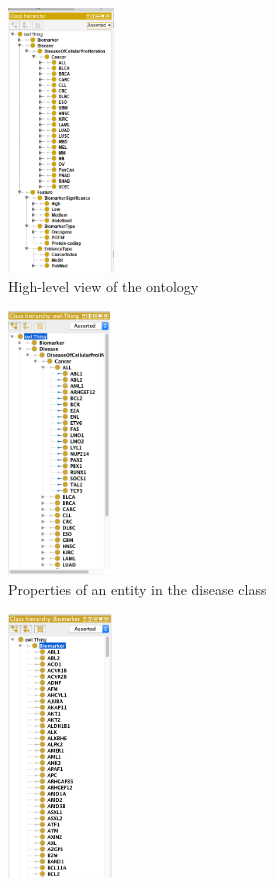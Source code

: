 \begin{figure}[h]
	\centering
	\begin{subfigure}{0.48\linewidth}
	\centering
		\includegraphics[width=0.55\linewidth,height=70mm]{images/OncoReferee.png}
		\caption{High-level view of the ontology}
        \label{fig:main_ontology_pro_view}
	\end{subfigure}
	\begin{subfigure}{0.48\linewidth}
		\centering
		\includegraphics[width=0.55\linewidth,height=70mm]{images/biomarker_view_2.png}
		\caption{Properties of an entity in the disease class}
        \label{fig:diseases_class}
	\end{subfigure}
	\begin{subfigure}{.48\linewidth}
		\centering
		\includegraphics[width=0.55\linewidth,height=70mm]{images/biomarker_view.png}

\end{subfigure}
\end{figure}
